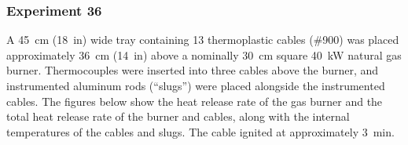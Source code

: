 \clearpage

\subsubsection{Experiment 36}

A 45~cm (18~in) wide tray containing 13 thermoplastic cables (\#900) was placed approximately 36~cm (14~in) above a nominally 30~cm square 40~kW natural gas burner. Thermocouples were inserted into three cables above the burner, and instrumented aluminum rods (``slugs'') were placed alongside the instrumented cables. The figures below show the heat release rate of the gas burner and the total heat release rate of the burner and cables, along with the internal temperatures of the cables and slugs. The cable ignited at approximately 3~min.

